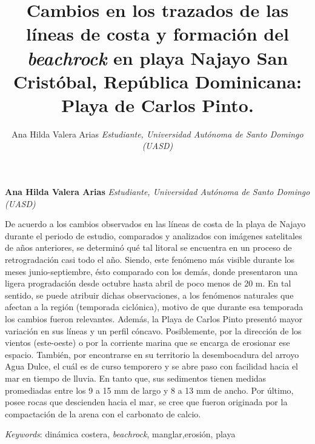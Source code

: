 \documentclass[11pt,]{article}
\title{\textbar{}Cambios en los trazados de las líneas de costa y formación del
\emph{beachrock} en playa Najayo San Cristóbal, República Dominicana:
Playa de Carlos Pinto.  }
\author{\Large Ana Hilda Valera Arias\vspace{0.05in} \newline\normalsize\emph{Estudiante, Universidad Autónoma de Santo Domingo (UASD)}  }
\date{}
\newcommand*{\authorfont}{\fontfamily{phv}\selectfont}
\renewenvironment{abstract}
 {{%
    \setlength{\leftmargin}{0mm}
    \setlength{\rightmargin}{\leftmargin}%
  }%
  \relax}
 {\endlist}
\begin{document}
	
%

{%
\setlength{\parindent}{0pt}
\thispagestyle{plain}
{\fontsize{18}{20}\selectfont\raggedright 
\maketitle  %

}

{
   \vskip 13.5pt\relax \normalsize\fontsize{11}{12} 
\textbf{\authorfont Ana Hilda Valera Arias} \hskip 15pt \emph{\small Estudiante, Universidad Autónoma de Santo Domingo (UASD)}   

}

}








\begin{abstract}

    \hbox{\vrule height .2pt width 39.14pc}

    \vskip 8.5pt %

\noindent De acuerdo a los cambios observados en las líneas de costa de la playa
de Najayo durante el periodo de estudio, comparados y analizados con
imágenes satelitales de años anteriores, se determinó qué tal litoral se
encuentra en un proceso de retrogradación casi todo el año. Siendo, este
fenómeno más visible durante los meses junio-septiembre, ésto comparado
con los demás, donde presentaron una ligera progradación desde octubre
hasta abril de poco menos de 20 m. En tal sentido, se puede atribuir
dichas observaciones, a los fenómenos naturales que afectan a la región
(temporada ciclónica), motivo de que durante esa temporada los cambios
fueron relevantes. Además, la Playa de Carlos Pinto presentó mayor
variación en sus líneas y un perfil cóncavo. Posiblemente, por la
dirección de los vientos (este-oeste) o por la corriente marina que se
encarga de erosionar ese espacio. También, por encontrarse en su
territorio la desembocadura del arroyo Agua Dulce, el cuál es de curso
temporero y se abre paso con facilidad hacia el mar en tiempo de lluvia.
En tanto que, sus sedimentos tienen medidas promediadas entre los 9 a 15
mm de largo y 8 a 13 mm de ancho. Por último, posee rocas que descienden
hacia el mar, se cree que fueron originada por la compactación de la
arena con el carbonato de calcio.


\vskip 8.5pt \noindent \emph{Keywords}: dinámica costera, \emph{beachrock}, manglar,erosión, playa \par

    \hbox{\vrule height .2pt width 39.14pc}



\end{abstract}
\end{document}
